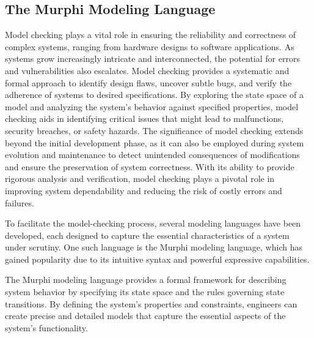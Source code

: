 
\subsection{The Murphi Modeling Language}\label{subsec:the-murphi-modeling-language}

Model checking plays a vital role in ensuring the reliability and correctness
of complex systems, ranging from hardware designs to software applications.
As systems grow increasingly intricate and interconnected, the potential for
errors and vulnerabilities also escalates.
Model checking provides a systematic and formal approach to identify design
flaws, uncover subtle bugs, and verify the adherence of systems to desired
specifications.
By exploring the state space of a model and analyzing the system's behavior
against specified properties, model checking aids in identifying critical
issues that might lead to malfunctions, security breaches, or safety hazards.
The significance of model checking extends beyond the initial development
phase, as it can also be employed during system evolution and maintenance to
detect unintended consequences of modifications and ensure the preservation
of system correctness.
With its ability to provide rigorous analysis and verification, model
checking plays a pivotal role in improving system dependability and reducing
the risk of costly errors and failures.

To facilitate the model-checking process, several modeling languages have been
developed, each designed to capture the essential characteristics of a system
under scrutiny.
One such language is the Murphi modeling language, which has gained popularity
due to its intuitive syntax and powerful expressive capabilities.

The Murphi modeling language provides a formal framework for describing system
behavior by specifying its state space and the rules governing state
transitions.
By defining the system's properties and constraints, engineers can create
precise and detailed models that capture the essential aspects of the system's
functionality.

